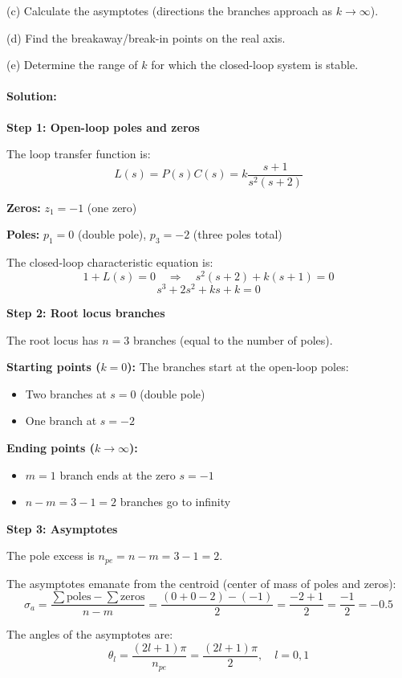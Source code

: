 \documentclass[11pt,a4paper]{article}
\begin{document}
(c) Calculate the asymptotes (directions the branches approach as $k \to \infty$).

(d) Find the breakaway/break-in points on the real axis.

(e) Determine the range of $k$ for which the closed-loop system is stable.

\paragraph{Solution:}

\textbf{Step 1: Open-loop poles and zeros}

The loop transfer function is:
\[
L(s) = P(s)C(s) = k\frac{s+1}{s^2(s+2)}
\]

\textbf{Zeros:} $z_1 = -1$ (one zero)

\textbf{Poles:} $p_1 = 0$ (double pole), $p_3 = -2$ (three poles total)

The closed-loop characteristic equation is:
\[
1 + L(s) = 0 \quad \Rightarrow \quad s^2(s+2) + k(s+1) = 0
\]
\[
s^3 + 2s^2 + ks + k = 0
\]

\textbf{Step 2: Root locus branches}

The root locus has $n = 3$ branches (equal to the number of poles).

\textbf{Starting points ($k = 0$):} The branches start at the open-loop poles:
\begin{itemize}
\item Two branches at $s = 0$ (double pole)
\item One branch at $s = -2$
\end{itemize}

\textbf{Ending points ($k \to \infty$):}
\begin{itemize}
\item $m = 1$ branch ends at the zero $s = -1$
\item $n - m = 3 - 1 = 2$ branches go to infinity
\end{itemize}

\textbf{Step 3: Asymptotes}

The pole excess is $n_{pe} = n - m = 3 - 1 = 2$.

The asymptotes emanate from the centroid (center of mass of poles and zeros):
\[
\sigma_a = \frac{\sum \text{poles} - \sum \text{zeros}}{n - m} = \frac{(0 + 0 - 2) - (-1)}{2} = \frac{-2 + 1}{2} = \frac{-1}{2} = -0.5
\]

The angles of the asymptotes are:
\[
\theta_l = \frac{(2l + 1)\pi}{n_{pe}} = \frac{(2l + 1)\pi}{2}, \quad l = 0, 1
\]
\end{document}
